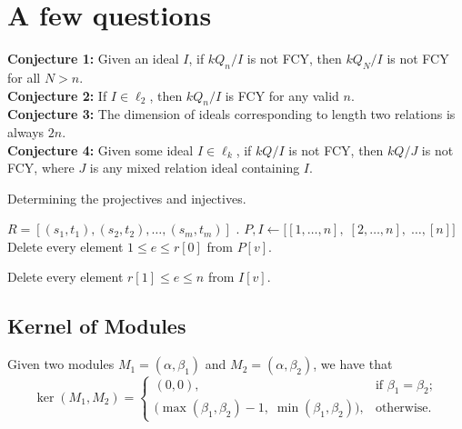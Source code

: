\documentclass{article}
\begin{document}
\begin{flushleft}
\begin{center}
   \end{center}
   \section{A few questions}
   \textbf{Conjecture 1:} Given an ideal $I$, if $kQ_n/I$ is not FCY, then $kQ_N/I$ is not FCY for all $N > n$. \\
   \textbf{Conjecture 2:} If $I \in \ell_2$, then $kQ_n / I$ is FCY for any valid $n$. \\
   \textbf{Conjecture 3:} The dimension of ideals corresponding to length two relations is always $2n$. \\
   \textbf{Conjecture 4:} Given some ideal $I \in \ell_k$, if $kQ/I$ is not FCY, then $kQ/J$ is not FCY, 
   where $J$ is any mixed relation ideal containing $I$.
\end{flushleft}

\begin{algorithm}
   \begin{algorithmic}[1]
      \caption{Determining the projectives and injectives.}
      \Require $R = [(s_1, t_1), (s_2, t_2), \ldots, (s_m, t_m)]$ .
      \State $P, I \gets \big[[1, \ldots, n],\; [2, \ldots, n],\; \ldots, [n]\big]$ 
      \State Delete every element $1 \leq e \leq r[0]$ from $P[v]$. 
      \EndFor

      \State Delete every element $r[1] \leq e \leq n$ from $I[v]$. 
      \EndFor
      \EndFor
   \end{algorithmic}
\end{algorithm}

\subsection*{Kernel of Modules}
Given two modules $M_1 = (\alpha,\beta_1)$ and $M_2 = (\alpha,\beta_2)$, we have that 
\[
   \ker(M_1,M_2) = 
   \begin{cases}
      (0,0), & \text{if } \beta_1 = \beta_2; \\
      \big(\max(\beta_1,\beta_2) - 1, \; \min(\beta_1, \beta_2)\big), & \text{otherwise.}
   \end{cases}
\]
\end{document}
